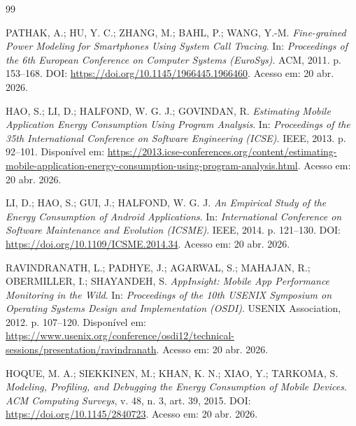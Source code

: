 \begin{thebibliography}{99}


PATHAK, A.; HU, Y. C.; ZHANG, M.; BAHL, P.; WANG, Y.-M.
\newblock \textit{Fine-grained Power Modeling for Smartphones Using System Call Tracing}.
\newblock In: \emph{Proceedings of the 6th European Conference on Computer Systems (EuroSys)}.
\newblock ACM, 2011. p. 153--168.
\newblock DOI: \url{https://doi.org/10.1145/1966445.1966460}.
\newblock Acesso em: 20 abr. 2026.

HAO, S.; LI, D.; HALFOND, W. G. J.; GOVINDAN, R.
\newblock \textit{Estimating Mobile Application Energy Consumption Using Program Analysis}.
\newblock In: \emph{Proceedings of the 35th International Conference on Software Engineering (ICSE)}.
\newblock IEEE, 2013. p. 92--101.
\newblock Disponível em: \url{https://2013.icse-conferences.org/content/estimating-mobile-application-energy-consumption-using-program-analysis.html}.
\newblock Acesso em: 20 abr. 2026.

LI, D.; HAO, S.; GUI, J.; HALFOND, W. G. J.
\newblock \textit{An Empirical Study of the Energy Consumption of Android Applications}.
\newblock In: \emph{International Conference on Software Maintenance and Evolution (ICSME)}.
\newblock IEEE, 2014. p. 121--130.
\newblock DOI: \url{https://doi.org/10.1109/ICSME.2014.34}.
\newblock Acesso em: 20 abr. 2026.

RAVINDRANATH, L.; PADHYE, J.; AGARWAL, S.; MAHAJAN, R.; OBERMILLER, I.; SHAYANDEH, S.
\newblock \textit{AppInsight: Mobile App Performance Monitoring in the Wild}.
\newblock In: \emph{Proceedings of the 10th USENIX Symposium on Operating Systems Design and Implementation (OSDI)}.
\newblock USENIX Association, 2012. p. 107--120.
\newblock Disponível em: \url{https://www.usenix.org/conference/osdi12/technical-sessions/presentation/ravindranath}.
\newblock Acesso em: 20 abr. 2026.

HOQUE, M. A.; SIEKKINEN, M.; KHAN, K. N.; XIAO, Y.; TARKOMA, S.
\newblock \textit{Modeling, Profiling, and Debugging the Energy Consumption of Mobile Devices}.
\newblock \emph{ACM Computing Surveys}, v. 48, n. 3, art. 39, 2015.
\newblock DOI: \url{https://doi.org/10.1145/2840723}.
\newblock Acesso em: 20 abr. 2026.


\end{thebibliography}
